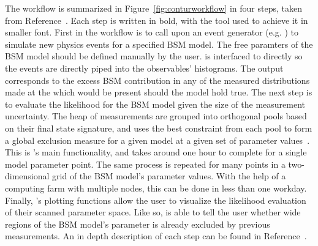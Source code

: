 The \contur workflow is summarized in Figure~\ref{fig:conturworkflow} in four steps, taken from Reference~\cite{conturmanual}. Each step is written in bold, with the tool used to achieve it in smaller font. First in the workflow is to call upon an event generator (e.g. \herwig) to simulate new physics events for a specified BSM model. The free paramters of the BSM model should be defined manually by the user. \herwig is interfaced to \rivet directly so the events are directly piped into the observables' histograms. The \rivet output corresponds to the excess BSM contribution in any of the measured distributions made at the \LHC which would be present should the model hold true. The next step is to evaluate the likelihood for the BSM model given the size of the measurement uncertainty. The heap of measurements are grouped into orthogonal pools based on their final state signature, and \contur uses the best constraint from each pool to form a global exclusion measure for a given model at a given set of parameter values~\cite{conturmanual}. This is \contur's main functionality, and takes around one hour to complete for a single model parameter point. The same process is repeated for many points in a two-dimensional grid of the BSM model's parameter values. With the help of a computing farm with multiple nodes, this can be done in less than one workday. Finally, \contur's plotting functions allow the user to visualize the likelihood evaluation of their scanned parameter space. Like so, \contur is able to tell the user whether wide regions of the BSM model's parameter is already excluded by \LHC previous measurements. An in depth description of each step can be found in Reference~\cite{conturmanual}. 
